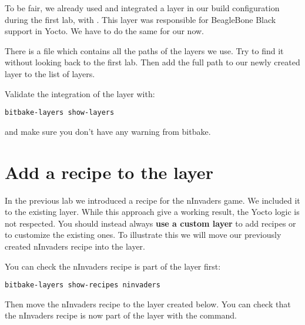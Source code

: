 To be fair, we already used and integrated a layer in our build configuration
during the first lab, with . This layer was responsible for
BeagleBone Black support in Yocto. We have to do the same for our
 now.

There is a file which contains all the paths of the layers we use. Try to find it
without looking back to the first lab. Then add the full path to our newly
created layer to the list of layers.

Validate the integration of the  layer with:
\begin{verbatim}
bitbake-layers show-layers
\end{verbatim}

and make sure you don't have any warning from bitbake.

\section{Add a recipe to the layer}

In the previous lab we introduced a recipe for the nInvaders game. We included
it to the existing  layer. While this approach give a working result,
the Yocto logic is not respected. You should instead always \textbf{use a custom layer}
to add recipes or to customize the existing ones. To illustrate this we will
move our previously created nInvaders recipe into the  layer.

You can check the nInvaders recipe is part of the  layer first:
\begin{verbatim}
bitbake-layers show-recipes ninvaders
\end{verbatim}

Then move the nInvaders recipe to the layer created below. You can check that
the nInvaders recipe is now part of the  layer with the
 command.
